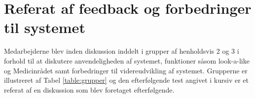 

\newpage
\section{Referat af feedback og forbedringer til systemet} \label{App:Referat}
Medarbejderne blev inden diskussion inddelt i grupper af henholdsvis 2 og 3 i forhold til at diskutere anvendeligheden af systemet, funktioner såsom look-a-like og Medicinrådet samt forbedringer til videreudvikling af systemet. Grupperne er illustreret af Tabel \ref{table:grupper} og den efterfølgende test angivet i kursiv er et referat af en diskussion som blev foretaget efterfølgende.

